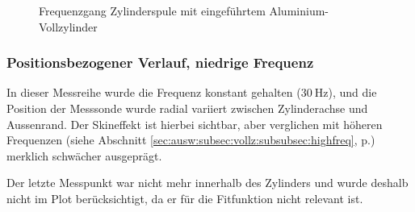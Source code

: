 \begin{figure}[h!]
    \resizebox{\textwidth}{!}{}
    \caption{Frequenzgang Zylinderspule mit eingef\"uhrtem Aluminium-Vollzylinder}
\end{figure}


\clearpage
\subsubsection{Positionsbezogener Verlauf, niedrige Frequenz}
\label{sec:ausw:subsec:hohlz:subsubsec:steel}

In    dieser    Messreihe    wurde     die    Frequenz    konstant    gehalten
($\SI{30}{\hertz}$),     und    die     Position    der     Messsonde    wurde
radial    variiert    zwischen     Zylinderachse    und    Aussenrand.     Der
Skineffekt   ist    hierbei   sichtbar,   aber   verglichen    mit   h\"oheren
Frequenzen  (siehe  Abschnitt  \ref{sec:ausw:subsec:vollz:subsubsec:highfreq},
p.\pageref{sec:ausw:subsec:vollz:subsubsec:highfreq})   merklich   schw\"acher
ausgepr\"agt.

Der letzte Messpunkt war nicht mehr  innerhalb des Zylinders und wurde deshalb
nicht im  Plot ber\"ucksichtigt,  da er f\"ur  die Fitfunktion  nicht relevant
ist.

